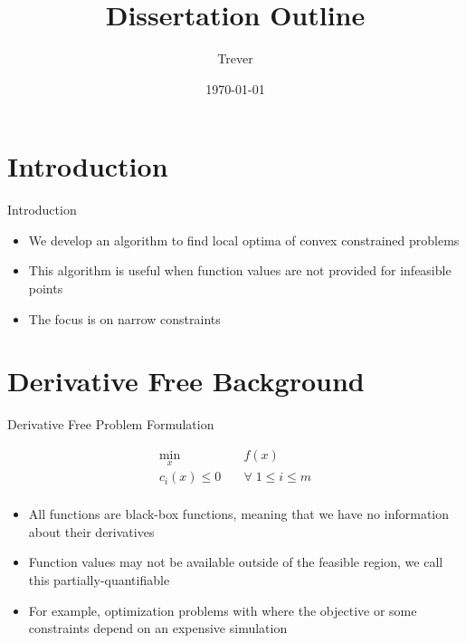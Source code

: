 \documentclass{beamer}
\begin{document}
\title{Dissertation Outline}   
\author{Trever} 
\date{\today} 

\frame{\titlepage} 

\section{Introduction}

\begin{frame}{Introduction}
    \begin{itemize}
        \item We develop an algorithm to find local optima of convex constrained problems
        \item This algorithm is useful when function values are not provided for infeasible points
        \item The focus is on narrow constraints
    \end{itemize}
\end{frame}

\section{Derivative Free Background}

\begin{frame}{Derivative Free Problem Formulation}
\begin{center}
\label{Problem}
\begin{align*}
\min_x & \quad f(x) \\
  c_i(x) \le 0   & \quad \forall \; 1 \le i \le m \\
\end{align*}
\end{center}
    \begin{itemize}
        \item All functions are black-box functions, meaning that we have no information about their derivatives
        \item Function values may not be available outside of the feasible region, we call this partially-quantifiable
        \item For example, optimization problems with where the objective or some constraints depend on an expensive simulation
    \end{itemize}
\end{frame}
\end{document}
